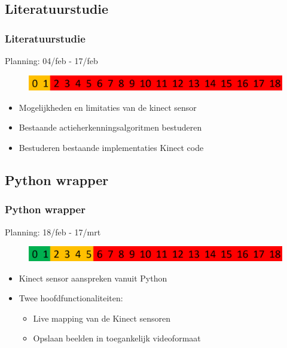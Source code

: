 \documentclass[handout]{beamer}
\begin{document}
	\subsection{Literatuurstudie}
	\begin{frame}
	\frametitle{Literatuurstudie}
		Planning: 04/feb - 17/feb
		\begin{figure}
		\includegraphics[width=\textwidth]{literatuur}
		\end{figure}
		\begin{itemize}
			\item<1- > Mogelijkheden en limitaties van de kinect sensor
			\item<2- > Bestaande actieherkenningsalgoritmen bestuderen
			\item<3- > Bestuderen bestaande implementaties Kinect code
		\end{itemize}
	\end{frame}

	\subsection{Python wrapper}
	\begin{frame}
	\frametitle{Python wrapper}
		Planning: 18/feb - 17/mrt
		\begin{figure}
		\includegraphics[width=\textwidth]{wrapper}
		\end{figure}
		\begin{itemize}
			\item<1- > Kinect sensor aanspreken vanuit Python
			\item<2- > Twee hoofdfunctionaliteiten:
			\begin{itemize}
				\item<2- > Live mapping van de Kinect sensoren
				\item<2- > Opslaan beelden in toegankelijk videoformaat
			\end{itemize}
		\end{itemize}
	\end{frame}
\end{document}
